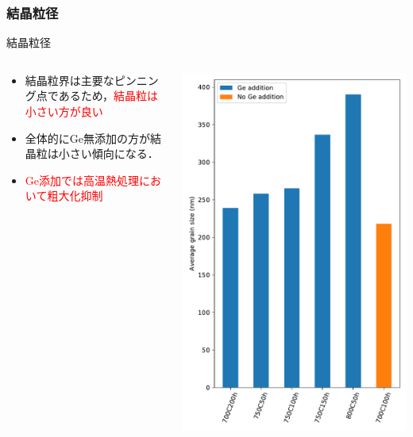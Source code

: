 \documentclass[aspectratio=169, unicode, 10pt]{beamer}
\begin{document}
	\subsubsection{結晶粒径}
	\begin{frame}{結晶粒径}
		\begin{columns}
			\begin{column}{0.6\linewidth}
				\begin{itemize}
					\item 結晶粒界は主要なピンニング点であるため，\textcolor{red}{結晶粒は小さい方が良い}
					\item 全体的にGe無添加の方が結晶粒は小さい傾向になる．
					\item \textcolor{red}{Ge添加では高温熱処理において粗大化抑制}
				\end{itemize}
			\end{column}
			\begin{column}{0.4\linewidth}
				\centering
				\includegraphics[width=0.9\linewidth]{figs/out.pdf}
			\end{column}
			
		\end{columns}
	\end{frame}
\end{document}
